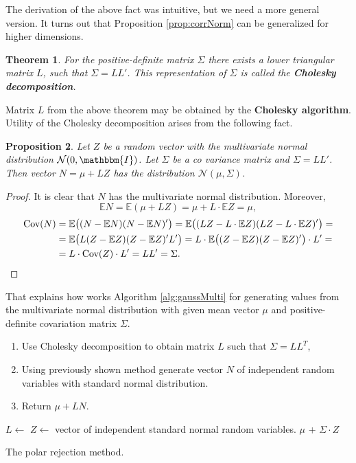 \documentclass[a4paper,11pt, twoside]{book}
\newtheorem{thm}{Theorem}[chapter]
\newtheorem{prop}[thm]{Proposition}
\theoremstyle{definition}
\theoremstyle{remark}
\def\E{{\mathbb{E}}}
\def\Cov{{\hbox{Cov}}}
\begin{document}
The derivation of the above fact was intuitive, but we need a more general version. It turns out that Proposition \ref{prop:corrNorm} can be generalized for higher dimensions.
\begin{thm}
 For the positive-definite matrix $\Sigma$ there exists a lower triangular matrix $L$, such that $\Sigma = LL'$. This representation of $\Sigma$ is called the \textbf{Cholesky decomposition}.
\end{thm}
Matrix $L$ from the above theorem may be obtained by the \textbf{Cholesky algorithm}. Utility of the Cholesky decomposition arises from the following fact.
\begin{prop}
 Let $Z$ be a random vector with the multivariate normal distribution $\mathcal{N}(0, \mathbbm{I})$. Let $\Sigma$ be a co variance matrix and $\Sigma = LL'$. Then vector $N = \mu + LZ$ has the distribution $\mathcal{N}(\mu, \Sigma)$.
\end{prop}
\begin{proof}
 It is clear that $N$ has the multivariate normal distribution. Moreover,
 \[ \E N = \E(\mu + LZ) = \mu + L\cdot\E Z = \mu, \]
 \begin{equation*}
  \begin{split}
 \Cov(N) &= \E \bigl( (N - \E N) (N - \E N)' \bigr) = \E \bigl( (LZ - L\cdot \E Z) (LZ - L\cdot \E Z)' \bigr) =\\
         &= \E \bigl( L(Z - \E Z) (Z - \E Z)'L' \bigr) = L\cdot \E \bigl( (Z - \E Z) (Z - \E Z)' \bigr) \cdot L' =\\
         &= L\cdot \Cov(Z) \cdot L'= LL' = \Sigma.   
  \end{split}
 \end{equation*}
\end{proof}


That explains how works Algorithm \ref{alg:gaussMulti} for generating values from the multivariate normal distribution with given mean vector $\mu$ and positive-definite covariation matrix $\Sigma$. 
\begin{enumerate}
 \item Use Cholesky decomposition to obtain matrix $L$ such that $\Sigma = LL^T$,
 \item Using previously shown method generate vector $N$ of independent random variables with standard normal distribution.
 \item Return $\mu + LN$.
\end{enumerate}
\begin{algorithm}
 \begin{algorithmic}[1]
    \State $L \gets $ 
    \State $Z \gets $ vector of independent standard normal random variables.
    \State {}
    \State \Return $\mu$ + $\Sigma \cdot Z$
  \EndFunction
 \end{algorithmic}
 \caption{The polar rejection method.}
 \label{alg:gaussMulti}
\end{algorithm}
\end{document}
